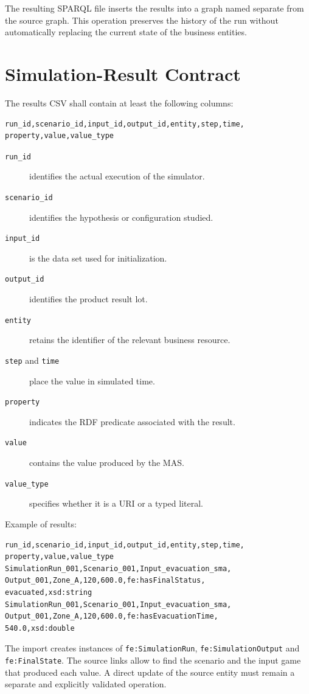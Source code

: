 \documentclass{article}
\begin{document}
The resulting SPARQL file inserts the results into a graph named separate from the source graph. This operation preserves the history of the run without automatically replacing the current state of the business entities.

\clearpage
\section{Simulation-Result Contract}

The results CSV shall contain at least the following columns:

\begin{lstlisting}
run_id,scenario_id,input_id,output_id,entity,step,time,
property,value,value_type
\end{lstlisting}

\begin{description}
\item[\texttt{run\_id}] identifies the actual execution of the simulator.
\item[\texttt{scenario\_id}] identifies the hypothesis or configuration studied.
\item[\texttt{input\_id}] is the data set used for initialization.
\item[\texttt{output\_id}] identifies the product result lot.
\item[\texttt{entity}] retains the identifier of the relevant business resource.
\item[\texttt{step} and \texttt{time}] place the value in simulated time.
\item[\texttt{property}] indicates the RDF predicate associated with the result.
\item[\texttt{value}] contains the value produced by the MAS.
\item[\texttt{value\_type}] specifies whether it is a URI or a typed literal.
\end{description}

Example of results:

\begin{lstlisting}
run_id,scenario_id,input_id,output_id,entity,step,time,
property,value,value_type
SimulationRun_001,Scenario_001,Input_evacuation_sma,
Output_001,Zone_A,120,600.0,fe:hasFinalStatus,
evacuated,xsd:string
SimulationRun_001,Scenario_001,Input_evacuation_sma,
Output_001,Zone_A,120,600.0,fe:hasEvacuationTime,
540.0,xsd:double
\end{lstlisting}

The import creates instances of \texttt{fe:SimulationRun}, \texttt{fe:SimulationOutput} and \texttt{fe:FinalState}. The source links allow to find the scenario and the input game that produced each value. A direct update of the source entity must remain a separate and explicitly validated operation.
\end{document}
